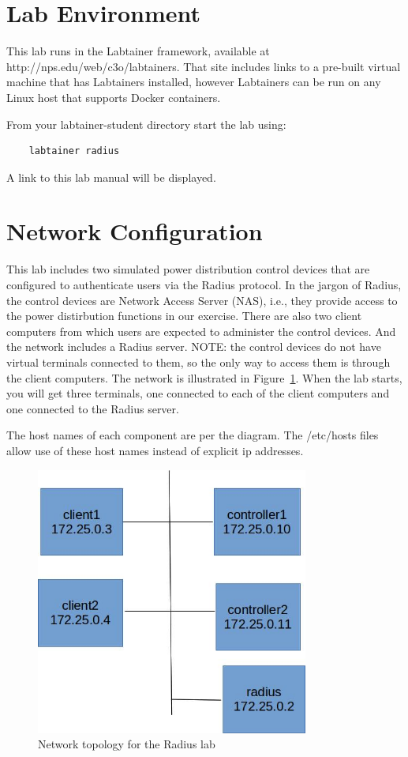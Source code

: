 \section{Lab Environment}
This lab runs in the Labtainer framework,
available at http://nps.edu/web/c3o/labtainers.
That site includes links to a pre-built virtual machine
that has Labtainers installed, however Labtainers can
be run on any Linux host that supports Docker containers.

From your labtainer-student directory start the lab using:
\begin{verbatim}
    labtainer radius
\end{verbatim}
\noindent A link to this lab manual will be displayed.  

\section{Network Configuration}
This lab includes two simulated power distribution control devices that
are configured to authenticate users via the Radius protocol.  In the jargon
of Radius, the control devices are Network Access Server (NAS), i.e., they
provide access to the power distirbution functions in our exercise. There
are also two client computers from which users are expected to administer
the control devices.  
And the network includes a Radius server.  NOTE: the control devices
do not have virtual terminals connected to them, so the only way to 
access them is through the client computers.  The network is
illustrated in Figure~\ref{fig:topology}.
When the lab starts, you will get three terminals, one connected to each
of the client computers and one connected to the Radius server.

The host names of each component are per the diagram.  The /etc/hosts files
allow use of these host names instead of explicit ip addresses.

\begin{figure}[H]
\begin{center}
\includegraphics [width=0.8\textwidth]{radius.jpg}
\end{center}
\caption{Network topology for the Radius lab}
\label{fig:topology}
\end{figure}

